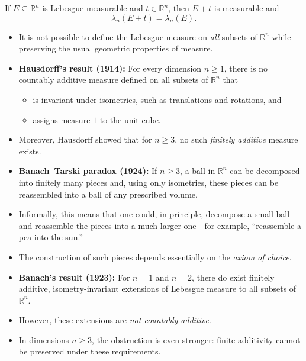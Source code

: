 \documentclass[12pt,a4paper]{article}
\begin{document}
\clearpage

\begin{theorem}
    If $E\subseteq\mathbb{R}^n$ is Lebesgue measurable and $t\in\mathbb{R}^n$, then $E+t$ is measurable and
    \[
        \lambda_n(E+t)=\lambda_n(E).
    \]
\end{theorem}

\clearpage

\begin{theorem}
    \begin{itemize}

    \item It is not possible to define the Lebesgue measure on \emph{all}
    subsets of $\mathbb{R}^n$ while preserving the usual geometric
    properties of measure.

    \item \textbf{Hausdorff's result (1914):}
    For every dimension $n \geq 1$, there is no countably additive measure
    defined on all subsets of $\mathbb{R}^n$ that
    \begin{itemize}
        \item is invariant under isometries, such as translations and rotations, and
        \item assigns measure $1$ to the unit cube.
    \end{itemize}

    \item Moreover, Hausdorff showed that for $n \geq 3$, no such
    \emph{finitely additive} measure exists.

    \item \textbf{Banach--Tarski paradox (1924):}
    If $n \geq 3$, a ball in $\mathbb{R}^n$ can be decomposed into finitely
    many pieces and, using only isometries, these pieces can be reassembled
    into a ball of any prescribed volume.

    \item Informally, this means that one could, in principle, decompose a
    small ball and reassemble the pieces into a much larger one---for example,
    ``reassemble a pea into the sun.''

    \item The construction of such pieces depends essentially on the
    \emph{axiom of choice}.

    \item \textbf{Banach's result (1923):}
    For $n=1$ and $n=2$, there do exist finitely additive,
    isometry-invariant extensions of Lebesgue measure to all subsets of
    $\mathbb{R}^n$.

    \item However, these extensions are \emph{not countably additive}.

    \item In dimensions $n \geq 3$, the obstruction is even stronger:
    finite additivity cannot be preserved under these requirements.

\end{itemize}
\end{theorem}
\end{document}
